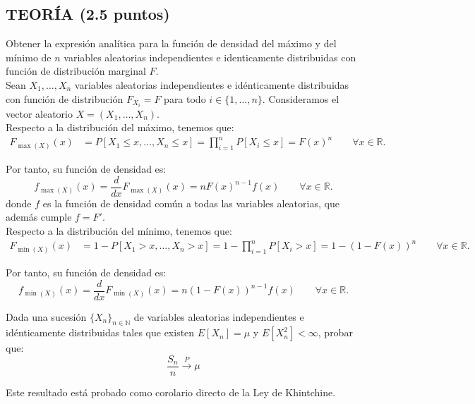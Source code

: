 \documentclass[12pt]{article}
\begin{document}
    \subsection*{TEORÍA (2.5 puntos)}
    \begin{ejercicio}
        Obtener la expresión analítica para la función de densidad del máximo y del mínimo de $n$ variables aleatorias independientes e identicamente distribuidas con función de distribución marginal $F$.\\

        Sean $X_1,\dots,X_n$ variables aleatorias independientes e idénticamente distribuidas con función de distribución $F_{X_i}=F$ para todo $i\in \{1,\dots,n\}$. Consideramos el vector aleatorio $X=(X_1,\dots,X_n)$.\\

        Respecto a la distribución del máximo, tenemos que:
        \begin{align*}
            F_{\max(X)}(x) &= P[X_1\leq x,\dots,X_n\leq x] = \prod_{i=1}^n P[X_i\leq x] = F(x)^n\qquad \forall x\in \mathbb{R}.
        \end{align*}

        Por tanto, su función de densidad es:
        \begin{equation*}
            f_{\max(X)}(x) = \frac{d}{dx}F_{\max(X)}(x) = nF(x)^{n-1}f(x)\qquad \forall x\in \mathbb{R}.
        \end{equation*}
        donde $f$ es la función de densidad común a todas las variables aleatorias, que además cumple $f=F'$.\\

        Respecto a la distribución del mínimo, tenemos que:
        \begin{align*}
            F_{\min(X)}(x) &= 1-P[X_1>x,\dots,X_n>x] = 1-\prod_{i=1}^n P[X_i>x] = 1-(1-F(x))^n\qquad \forall x\in \mathbb{R}.
        \end{align*}

        Por tanto, su función de densidad es:
        \begin{equation*}
            f_{\min(X)}(x) = \frac{d}{dx}F_{\min(X)}(x) = n(1-F(x))^{n-1}f(x)\qquad \forall x\in \mathbb{R}.
        \end{equation*}

    \end{ejercicio}

    \begin{ejercicio}
        Dada una sucesión $\{X_n\}_{n\in \mathbb{N}}$ de variables aleatorias independientes e idénticamente distribuidas tales que existen $E[X_n] = \mu$ y $E[X_n^2] < \infty$, probar que:
        $$\frac{S_n}{n}\stackrel{P}{\rightarrow} \mu$$

        Este resultado está probado como corolario directo de la Ley de Khintchine.
    \end{ejercicio}
\end{document}
